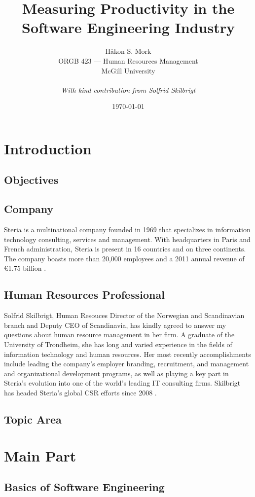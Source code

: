 \documentclass[letterpaper, 12pt]{report}
\title{\Huge \textbf{Measuring Productivity in the Software Engineering Industry}}
\author{
	Håkon S. Mork \\ 
	ORGB 423 --- Human Resources Management \\ 
	McGill University \\
	\\
	\emph{With kind contribution from Solfrid Skilbrigt}
}
\date{\today}
\begin{document}
\maketitle
\tableofcontents

\chapter{Introduction}
\section{Objectives}
\section{Company}
Steria is a multinational company founded in 1969 that specializes in information technology consulting, services and management. 
With headquarters in Paris and French administration, Steria is present in 16 countries and on three continents. 
The company boasts more than 20,000 employees and a 2011 annual revenue of €1.75 billion \parencite{steria:stats}.

\section{Human Resources Professional}
Solfrid Skilbrigt, Human Resouces Director of the Norwegian and Scandinavian branch and Deputy CEO of Scandinavia, has kindly agreed to answer my questions about human resource management in her firm. 
A graduate of the University of Trondheim, she has long and varied experience in the fields of information technology and human resources.
Her most recently accomplishments include leading the company's employer branding, recruitment, and management and organizational development programs, as well as playing a key part in Steria's evolution into one of the world's leading IT consulting firms. 
Skilbrigt has headed Steria's global CSR efforts since 2008 \parencite{steria:solfrid}.


\section{Topic Area}

\chapter{Main Part}
\section{Basics of Software Engineering}
\end{document}
